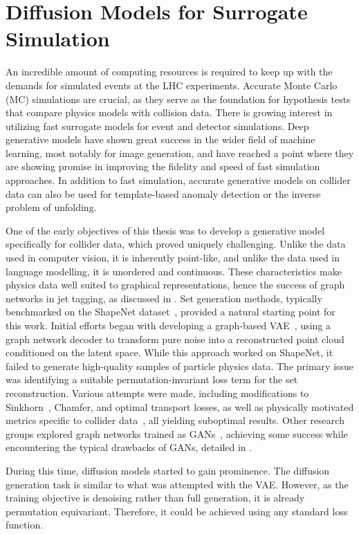 \chapter{Diffusion Models for Surrogate Simulation}

An incredible amount of computing resources is required to keep up with the demands for simulated events at the LHC experiments.
Accurate Monte Carlo (MC) simulations are crucial, as they serve as the foundation for hypothesis tests that compare physics models with collision data.
There is growing interest in utilizing fast surrogate models for event and detector simulations.
Deep generative models have shown great success in the wider field of machine learning, most notably for image generation, and have reached a point where they are showing promise in improving the fidelity and speed of fast simulation approaches.
In addition to fast simulation, accurate generative models on collider data can also be used for template-based anomaly detection or the inverse problem of unfolding.

One of the early objectives of this thesis was to develop a generative model specifically for collider data, which proved uniquely challenging.
Unlike the data used in computer vision, it is inherently point-like, and unlike the data used in language modelling, it is unordered and continuous.
These characteristics make physics data well suited to graphical representations, hence the success of graph networks in jet tagging, as discussed in .
Set generation methods, typically benchmarked on the ShapeNet dataset~\cite{ShapeNet}, provided a natural starting point for this work.
Initial efforts began with developing a graph-based VAE~\cite{SetVAE}, using a graph network decoder to transform pure noise into a reconstructed point cloud conditioned on the latent space.
While this approach worked on ShapeNet, it failed to generate high-quality samples of particle physics data.
The primary issue was identifying a suitable permutation-invariant loss term for the set reconstruction.
Various attempts were made, including modifications to Sinkhorn~\cite{Sinkhorn}, Chamfer, and optimal transport losses, as well as physically motivated metrics specific to collider data~\cite{MetricSpaceCollider}, all yielding suboptimal results.
Other research groups explored graph networks trained as GANs~\cite{MPGAN, EPICGAN}, achieving some success while encountering the typical drawbacks of GANs, detailed in .

During this time, diffusion models started to gain prominence.
The diffusion generation task is similar to what was attempted with the VAE\@.
However, as the training objective is denoising rather than full generation, it is already permutation equivariant.
Therefore, it could be achieved using any standard loss function.

